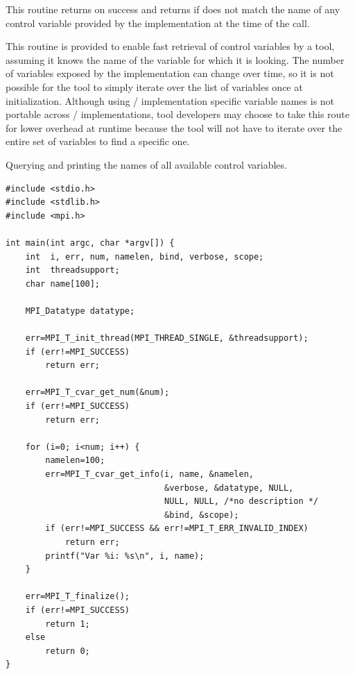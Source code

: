 This routine returns  on success and returns
 if  does not match the name
of any control variable provided by the implementation at the time of the
call.

\begin{rationale}
This routine is provided to enable fast retrieval of control variables by a
tool, assuming it knows the name of the variable for which it is looking.
The number of variables exposed by the implementation can change over time,
so it is not possible for the tool to simply iterate over the list of
variables once at initialization.  Although using \MPI/ implementation
specific variable names is not portable across \MPI/ implementations, tool
developers may choose to take this route for lower overhead at runtime
because the tool will not have to iterate over the entire set of variables
to find a specific one.
\end{rationale}

\begin{example}
%
Querying and printing the names of all available control variables.

\begin{lstlisting}[language={[MPI]C}]
#include <stdio.h>
#include <stdlib.h>
#include <mpi.h>

int main(int argc, char *argv[]) {
    int  i, err, num, namelen, bind, verbose, scope;
    int  threadsupport;
    char name[100];

    MPI_Datatype datatype;

    err=MPI_T_init_thread(MPI_THREAD_SINGLE, &threadsupport);
    if (err!=MPI_SUCCESS)
        return err;

    err=MPI_T_cvar_get_num(&num);
    if (err!=MPI_SUCCESS)
        return err;

    for (i=0; i<num; i++) {
        namelen=100;
        err=MPI_T_cvar_get_info(i, name, &namelen,
                                &verbose, &datatype, NULL,
                                NULL, NULL, /*no description */
                                &bind, &scope);
        if (err!=MPI_SUCCESS && err!=MPI_T_ERR_INVALID_INDEX)
            return err;
        printf("Var %i: %s\n", i, name);
    }

    err=MPI_T_finalize();
    if (err!=MPI_SUCCESS)
        return 1;
    else
        return 0;
}
\end{lstlisting}

\end{example}

